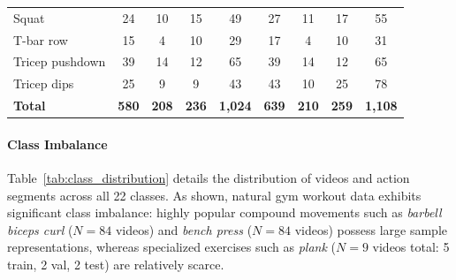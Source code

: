 \documentclass[preprint,12pt]{elsarticle}
\begin{document}
\begin{table}[!t]
{\begin{tabular}{l cccc cccc}
Squat                   & 24 & 10 & 15 & 49  & 27 & 11 & 17 & 55 \\
T-bar row               & 15 &  4 & 10 & 29  & 17 &  4 & 10 & 31 \\
Tricep pushdown         & 39 & 14 & 12 & 65  & 39 & 14 & 12 & 65 \\
Tricep dips             & 25 &  9 &  9 & 43  & 43 & 10 & 25 & 78 \\
\midrule
\textbf{Total}          & \textbf{580} & \textbf{208} & \textbf{236} & \textbf{1,024} & \textbf{639} & \textbf{210} & \textbf{259} & \textbf{1,108} \\
\bottomrule
\end{tabular}
}
\end{table}

\paragraph{Class Imbalance} 
Table~\ref{tab:class_distribution} details the distribution of videos and action segments across all 22 classes. As shown, natural gym workout data exhibits significant class imbalance: highly popular compound movements such as \textit{barbell biceps curl} ($N=84$ videos) and \textit{bench press} ($N=84$ videos) possess large sample representations, whereas specialized exercises such as \textit{plank} ($N=9$ videos total: 5 train, 2 val, 2 test) are relatively scarce. 

\end{document}

